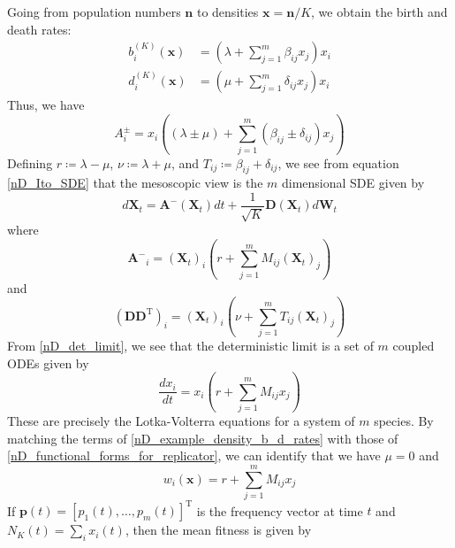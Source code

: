 Going from population numbers $\mathbf{n}$ to densities $\mathbf{x} = \mathbf{n}/K$, we obtain the birth and death rates:
\begin{equation}
\label{nD_example_density_b_d_rates}
\begin{aligned}
b^{(K)}_i(\mathbf{x}) &= \left(\lambda + \sum\limits_{j=1}^{m}\beta_{ij}x_j\right)x_i\\
d^{(K)}_i(\mathbf{x}) &= \left(\mu + \sum\limits_{j=1}^{m}\delta_{ij}x_j\right)x_i
\end{aligned}
\end{equation}
Thus, we have
\begin{equation*}
A^{\pm}_{i} = x_i\left(\left(\lambda \pm \mu\right) + \sum\limits_{j=1}^{m}\left(\beta_{ij} \pm \delta_{ij}\right)x_j\right)
\end{equation*}
Defining $r \coloneqq \lambda - \mu$, $\nu \coloneqq \lambda + \mu$, and $T_{ij} \coloneqq \beta_{ij} + \delta_{ij}$, we see from equation \eqref{nD_Ito_SDE} that the mesoscopic view is the $m$ dimensional SDE given by
\begin{equation}
\label{nD_example_SDE}
d\mathbf{X}_{t} = \mathbf{A^-}(\mathbf{X}_t)dt + \frac{1}{\sqrt{K}}\mathbf{D}(\mathbf{X}_t)d\mathbf{W}_t
\end{equation}
where 
\begin{equation*}
\mathbf{A^-}_i = {(\mathbf{X}_{t})}_i(r + \sum\limits_{j=1}^{m}M_{ij}{(\mathbf{X}_{t})}_j) 
\end{equation*}
and
\begin{equation*}
(\mathbf{D}\mathbf{D}^{\mathrm{T}})_i = {(\mathbf{X}_{t})}_i(\nu + \sum\limits_{j=1}^{m}T_{ij}{(\mathbf{X}_{t})}_j) 
\end{equation*}
From \eqref{nD_det_limit}, we see that the deterministic limit is a set of $m$ coupled ODEs given by
\begin{equation}
\label{nD_example_det_limit}
\frac{d x_i}{dt} = x_i\left(r + \sum\limits_{j=1}^{m}M_{ij}x_j\right)
\end{equation}
These are precisely the Lotka-Volterra equations for a system of $m$ species. By matching the terms of \eqref{nD_example_density_b_d_rates} with those of \eqref{nD_functional_forms_for_replicator}, we can identify that we have $\mu = 0$ and
\begin{equation}
\label{nD_example_fitness}
w_i(\mathbf{x}) = r + \sum\limits_{j=1}^{m}M_{ij}x_j
\end{equation}
If $\mathbf{p}(t) = [p_1(t),\ldots,p_m(t)]^{\mathrm{T}}$ is the frequency vector at time $t$ and $N_K(t) = \sum_i x_i(t)$, then the mean fitness is given by
